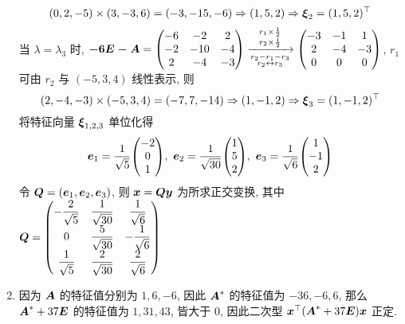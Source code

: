 \begin{solution}
\begin{enumerate}[label=(\arabic{*})]
              $$(0,2,-5)\times(3,-3,6)=(-3,-15,-6)\Rightarrow(1,5,2)\Rightarrow \vb*{\xi}_2=(1,5,2)^\top$$
              当 $\lambda=\lambda_3$ 时, $\vb*{-6\vb*{E}-\vb*{A}}=\mqty(-6&-2&2\\-2&-10&-4\\2&-4&-3)\xrightarrow[\substack{r_2-r_1-r_3\\r_2\leftrightarrow r_3}]{\substack{r_1\times\frac{1}{2}\\r_2\times\frac{1}{2}}}\mqty(-3&-1&1\\2&-4&-3\\0&0&0)$, $r_1$ 可由 $r_2$ 与 $(-5,3,4)$ 线性表示, 则
              $$(2,-4,-3)\times(-5,3,4)=(-7,7,-14)\Rightarrow (1,-1,2)\Rightarrow \vb*{\xi}_3=(1,-1,2)^\top$$
              将特征向量 $\vb*{\xi}_{1,2,3}$ 单位化得
              $$\vb*{e}_1=\dfrac{1}{\sqrt{5}}\mqty(-2\\0\\1),~\vb*{e}_2=\dfrac{1}{\sqrt{30}}\mqty(1\\5\\2),~\vb*{e}_3=\dfrac{1}{\sqrt{6}}\mqty(1\\-1\\2)$$
              令 $\vb*{Q}=(\vb*{e}_1,\vb*{e}_2,\vb*{e}_3)$, 则 $\vb*{x}=\vb*{Qy}$ 为所求正交变换, 其中 $\vb*{Q}=\mqty(-\dfrac{2}{\sqrt{5}}&\dfrac{1}{\sqrt{30}}&\dfrac{1}{\sqrt{6}}\\[6pt]0&\dfrac{5}{\sqrt{30}}&-\dfrac{1}{\sqrt{6}}\\[6pt]\dfrac{1}{\sqrt{5}}&\dfrac{2}{\sqrt{30}}&\dfrac{2}{\sqrt{6}})$
        \item 因为 $\vb*{A}$ 的特征值分别为 $1,6,-6$, 因此 $\vb*{A}^*$ 的特征值为 $-36,-6,6$, 那么 $\vb*{A}^*+37\vb*{E}$ 的特征值为 $1,31,43$, 皆大于 0, 因此二次型 $\vb*{x}^\top\qty(\vb*{A}^*+37\vb*{E})\vb*{x}$ 正定.
    \end{enumerate}
\end{solution}


